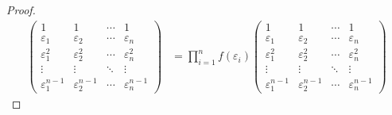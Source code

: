 \documentclass[class=linear-algebra,crop=false]{standalone}
\begin{document}
\begin{proof}
\begin{align*}
		\begin{pmatrix}
			1                     & 1                     & \cdots & 1                     \\
			\varepsilon_{1}       & \varepsilon_{2}       & \cdots & \varepsilon_{n}       \\
			\varepsilon_{1}^{2}   & \varepsilon_{2}^{2}   & \cdots & \varepsilon_{n}^{2}   \\
			\vdots                & \vdots                & \ddots & \vdots                \\
			\varepsilon_{1}^{n-1} & \varepsilon_{2}^{n-1} & \cdots & \varepsilon_{n}^{n-1}
		\end{pmatrix}
		 & = \prod^{n}_{i=1}f(\varepsilon_{i})
		\begin{pmatrix}
			1                     & 1                     & \cdots & 1                     \\
			\varepsilon_{1}       & \varepsilon_{2}       & \cdots & \varepsilon_{n}       \\
			\varepsilon_{1}^{2}   & \varepsilon_{2}^{2}   & \cdots & \varepsilon_{n}^{2}   \\
			\vdots                & \vdots                & \ddots & \vdots                \\
			\varepsilon_{1}^{n-1} & \varepsilon_{2}^{n-1} & \cdots & \varepsilon_{n}^{n-1}
		\end{pmatrix}
	\end{align*}
	\endgroup{}


\end{proof}
\end{document}
